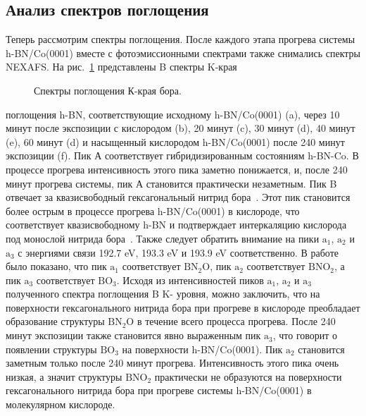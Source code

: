 \subsection{Анализ спектров поглощения}

Теперь рассмотрим спектры поглощения. После каждого этапа прогрева системы h-BN/Co(0001) вместе с фотоэмиссионными спектрами также снимались спектры NEXAFS. На рис.~\ref{pic:NEXAFS_B_K_edge} представлены B спектры  K-края
	\begin{figure}[!ht]
		\caption{Спектры поглощения К-края бора.}
		\label{pic:NEXAFS_B_K_edge}
	\end{figure}
поглощения h-BN, соответствующие исходному h-BN/Co(0001) (a), через 10 минут после экспозиции с кислородом (b), 
20 минут (c), 30 минут (d), 40 минут (e), 60 минут (d) и насыщенный кислородом h-BN/Co(0001) после 240 минут экспозиции (f). Пик А соответствует гибридизированным состояниям h-BN-Co. В процессе прогрева интенсивность этого пика заметно понижается, и, после 240 минут прогрева системы, пик А становится практически незаметным. Пик B отвечает за квазисвободный гексагональный нитрид бора~\cite{Huber2015_Oxy_Stab_defffects_in_hBN}. Этот пик становится более острым в процессе прогрева h-BN/Co(0001) в кислороде, что соответствует квазисвободному h-BN и подтверждает интеркаляцию кислорода под монослой нитрида бора~\cite{Makarova2019_h-BN/Ni_Oxydation, Shevelev2019_h-BN/Co_oxydation}. Также следует
обратить внимание на пики $\mathrm{a_1}$, $\mathrm{a_2}$ и $\mathrm{a_3}$ с энергиями связи 192.7 eV, 193.3 eV и 193.9 eV соответственно. В работе \cite{Huber2015_Oxy_Stab_defffects_in_hBN} было показано, что пик $\mathrm{a_1}$ соответствует $\mathrm{BN_2O}$, пик $\mathrm{a_2}$ соответствует $\mathrm{BNO_2}$, а пик $\mathrm{a_3}$ соответствует $\mathrm{BO_3}$. Исходя из интенсивностей пиков $\mathrm{a_1}$, $\mathrm{a_2}$ и $\mathrm{a_3}$ полученного спектра поглощения B K- уровня, можно заключить, что на поверхности гексагонального нитрида бора при прогреве в кислороде преобладает образование структуры $\mathrm{BN_2O}$ в течение всего процесса прогрева. После 240 минут экспозиции также становится явно выраженным пик $\mathrm{a_3}$, что говорит о появлении структуры $\mathrm{BO_3}$ на поверхности 
h-BN/Co(0001). Пик $\mathrm{a_2}$ становится заметным только после 240 минут прогрева. Интенсивность этого пика очень низкая, а значит структуры $\mathrm{BNO_2}$ практически не образуются на поверхности гексагонального нитрида бора при прогреве системы h-BN/Co(0001) в молекулярном кислороде.



